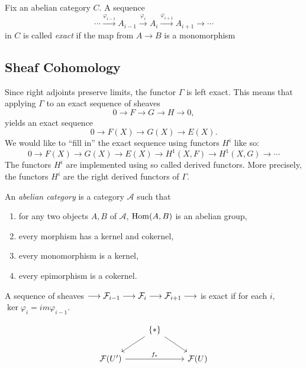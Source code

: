 \begin{definition}
	Fix an abelian category $C$.  A sequence 
	\[ \cdots \xrightarrow{\varphi_{i-1}} A_{i-1} \xrightarrow{\varphi_{i}} A_{i} \xrightarrow{\varphi_{i+1}} A_{i+1} \to \cdots\]
	in $C$ is called \textit{exact} if the map from $A \to B$ is a monomorphism
\end{definition}

\subsection{Sheaf Cohomology}
Since right adjoints preserve limits, the functor $\Gamma$ is left exact. This means that applying $\Gamma$ to an exact sequence of sheaves 
\[0 \to F \to G \to H \to 0,\]
yields an exact sequence
\[0 \to F(X) \to G(X) \to E(X).\]
We would like to ``fill in'' the exact sequence using functors $H^i$ like so:
\[0 \to F(X) \to G(X) \to E(X) \to H^1(X, F) \to H^1(X,G) \to\cdots \]
The functors $H^i$ are implemented using so called derived functors. More precisely, the functors $H^i$ are the right derived functors of $\Gamma$.

\begin{remark}
	An \textit{abelian category} is a category $\mathcal{A}$ such that
	\begin{enumerate}
		\item for any two objects $A,B$ of $\mathcal{A}$, $\operatorname{Hom}(A,B)$ is an abelian group,
		\item every morphism has a kernel and cokernel,
		\item every monomorphism is a kernel,
		\item every epimorphism is a cokernel.
	\end{enumerate}
\end{remark}

\begin{definition}
  A sequence of sheaves $\longrightarrow \mathcal{F}_{i-1} \longrightarrow \mathcal{F}_{i} \longrightarrow \mathcal{F}_{i+1} \longrightarrow$
	is exact if for each $i$, $\ker \varphi_i = im \varphi_{i-1}$.
\end{definition}

\[
	\begin{tikzcd}
		& {\{*\}} \\
		{\Sh{F}(U')} && {\Sh{F}(U)}
		\arrow[from=1-2, to=2-1]
		\arrow["{f_*}", from=2-1, to=2-3]
		\arrow[from=1-2, to=2-3]
	\end{tikzcd}
\]

